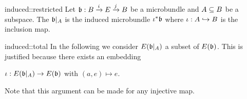 \begin{myparagraph}
    
\end{myparagraph}

\begin{myexample}{induced::restricted}    
    Let $\bb: \bundle{B}{E}{i}{j}$ be a microbundle and $A \sub B$ be a subspace.
    The  $\bb\restr{A}$ is the induced microbundle $\iota^*\bb$ where $\iota: A \incl B$ is the inclusion map.
\end{myexample}

\begin{myremark}{induced::total}
    In the following we consider $E(\bb\restr{A})$ a subset of $E(\bb)$.
    This is justified because there exists an embedding
    \begin{center}
        $\iota: E(\bb\restr{A}) \to E(\bb)$ with $(a, e) \mapsto e$.
    \end{center}
    Note that this argument can be made for any injective map.
\end{myremark}